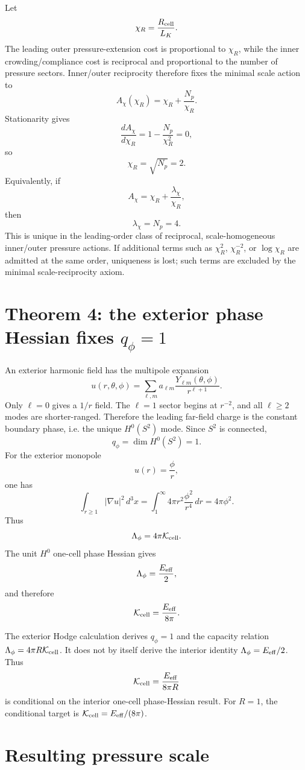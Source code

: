 \documentclass[11pt]{article}
\newcommand{\Kcell}{\mathcal K_{\rm cell}}
\newcommand{\Eeff}{E_{\rm eff}}
\begin{document}
Let
\[
  \chi_R=\frac{R_{\rm cell}}{L_K}.
\]
The leading outer pressure-extension cost is proportional to \(\chi_R\), while
the inner crowding/compliance cost is reciprocal and proportional to the number
of pressure sectors.  Inner/outer reciprocity therefore fixes the minimal
scale action to
\[
  A_\chi(\chi_R)
  =
  \chi_R+\frac{N_p}{\chi_R}.
\]
Stationarity gives
\[
  \frac{dA_\chi}{d\chi_R}
  =
  1-\frac{N_p}{\chi_R^2}
  =
  0,
\]
so
\[
  \chi_R=\sqrt{N_p}=2.
\]
Equivalently, if
\[
  A_\chi=\chi_R+\frac{\lambda_\chi}{\chi_R},
\]
then
\[
  \lambda_\chi=N_p=4.
\]
This is unique in the leading-order class of reciprocal, scale-homogeneous
inner/outer pressure actions.  If additional terms such as \(\chi_R^2\),
\(\chi_R^{-2}\), or \(\log\chi_R\) are admitted at the same order, uniqueness is
lost; such terms are excluded by the minimal scale-reciprocity axiom.

\section{Theorem 4: the exterior phase Hessian fixes \(q_\phi=1\)}

An exterior harmonic field has the multipole expansion
\[
  u(r,\theta,\phi)
  =
  \sum_{\ell,m}
  a_{\ell m}
  \frac{Y_{\ell m}(\theta,\phi)}{r^{\ell+1}}.
\]
Only \(\ell=0\) gives a \(1/r\) field.  The \(\ell=1\) sector begins at
\(r^{-2}\), and all \(\ell\ge2\) modes are shorter-ranged.  Therefore the
leading far-field charge is the constant boundary phase, i.e. the unique
\(H^0(S^2)\) mode.  Since \(S^2\) is connected,
\[
  q_\phi=\dim H^0(S^2)=1.
\]
For the exterior monopole
\[
  u(r)=\frac{\phi}{r},
\]
one has
\[
  \int_{r\ge1}
  |\nabla u|^2\,d^3x
  =
  \int_1^\infty
  4\pi r^2\frac{\phi^2}{r^4}\,dr
  =
  4\pi\phi^2.
\]
Thus
\[
  \Lambda_\phi=4\pi\Kcell.
\]
The unit \(H^0\) one-cell phase Hessian gives
\[
  \Lambda_\phi=\frac{\Eeff}{2},
\]
and therefore
\[
  \Kcell
  =
  \frac{\Eeff}{8\pi}.
\]


The exterior Hodge calculation derives \(q_\phi=1\) and the capacity relation
\(\Lambda_\phi=4\pi R\mathcal K_{\rm cell}\).  It does not by itself derive the
interior identity \(\Lambda_\phi=E_{\rm eff}/2\).  Thus
\[
  \mathcal K_{\rm cell}=\frac{E_{\rm eff}}{8\pi R}
\]
is conditional on the interior one-cell phase-Hessian result.  For \(R=1\), the
conditional target is \(\mathcal K_{\rm cell}=E_{\rm eff}/(8\pi)\).

\section{Resulting pressure scale}
\end{document}
